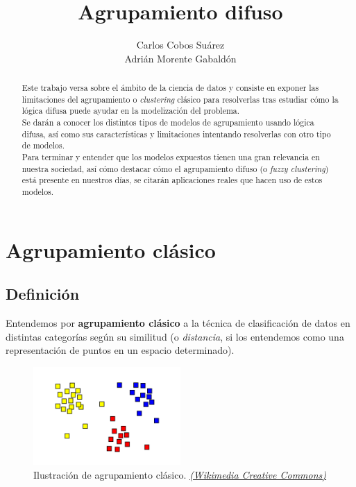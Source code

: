 \documentclass[]{report}
\title{Agrupamiento difuso}
\author{Carlos Cobos Suárez\\Adrián Morente Gabaldón}
\begin{document}
\maketitle

\begin{abstract}
	
	Este trabajo versa sobre el ámbito de la ciencia de datos y consiste en exponer las limitaciones del agrupamiento o \textit{clustering} clásico para resolverlas tras estudiar cómo la lógica difusa puede ayudar en la modelización del problema.\\
	
	Se darán a conocer los distintos tipos de modelos de agrupamiento usando lógica difusa, así como sus características y limitaciones intentando resolverlas con otro tipo de modelos.\\
	
	Para terminar y entender que los modelos expuestos tienen una gran relevancia en nuestra sociedad, así cómo destacar cómo el agrupamiento difuso (o \textit{fuzzy clustering}) está presente en nuestros días, se citarán aplicaciones reales que hacen uso de estos modelos.\\
	
\end{abstract}

	\chapter{Agrupamiento clásico}
	
		\section{Definición}
		
			Entendemos por \textbf{agrupamiento clásico} a la técnica de clasificación de datos en distintas categorías según su similitud (o \textit{distancia}, si los entendemos como una representación de puntos en un espacio determinado).
			
			\begin{figure}[h!]
				\centering
				\includegraphics[width=0.5\textwidth]{clustering.png}
				\caption{Ilustración de agrupamiento clásico. \href{https://en.wikipedia.org/wiki/Cluster_analysis\#/media/File:Cluster-2.svg}{ \textit{(Wikimedia Creative Commons)}}}
				\label{clustering1}
			\end{figure}
		
\end{document}

